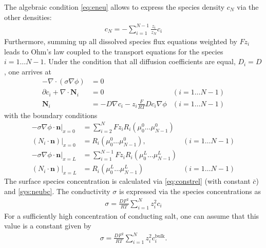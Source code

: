\documentclass[12pt,oneside,reqno]{amsart}
\numberwithin{equation}{section}
\begin{document}
The algebraic condition \ref{eq:eneu} allows to express the species density $c_{N}$ 
via the other densities:
\begin{align}
  c_N=-\sum_{i=1}^{N-1} \frac{z_i}{z_N} c_i
\end{align}
Furthermore, summing up all dissolved species flux equations weighted by $Fz_i$ leads to Ohm's law
coupled to the transport equations for the species $i=1\dots N-1$. Under the condition that all
diffusion coefficients are equal, $D_i=D$, one arrives at
\begin{subequations}\label{sys:ONP}
\begin{align}
  -\nabla\cdot (\sigma\nabla\phi) &= 0\\
  \partial c_i  + \nabla \cdot \mathbf N_i  &=0 & (i=1\dots N-1)\\
  \mathbf N_i &= -D \nabla c_i  - z_i \frac{F}{RT}  D c_i \nabla \phi \label{eq:xddflux} & (i=1\dots N-1)
\end{align}
\end{subequations}
with the boundary conditions
\begin{subequations}\label{ONPbc}
\begin{align}
  -\sigma\nabla\phi \cdot \mathbf n|_{x=0} &= \sum_{i=2}^N Fz_iR_i(\mu_0^0\dots\mu_{N-1}^0)\\
  (N_i\cdot \mathbf n)|_{x=0}&=R_i(\mu_0^0\dots\mu_{N-1}^0), & (i=1\dots N-1)\\
  -\sigma\nabla\phi \cdot \mathbf n|_{x=L} &= \sum_{i=1}^{N-1} Fz_iR_i(\mu_0^L\dots\mu_{N-1}^L)\\
  (N_i\cdot \mathbf n)|_{x=L} &=R_i(\mu_0^L\dots\mu_{N-1}^L) & (i=1\dots N-1)
\end{align}
\end{subequations}
The surface species concentration is calculated via \eqref{eq:constrel} (with constant $\bar c$) and
  \eqref{sys:neubc}.
The  conductivity $\sigma$ is expressed via the species concentrations as
\begin{align}
  \sigma= \frac{DF^2}{RT}\sum_{i=1}^N z_i^2 c_i
\end{align}
For a sufficiently high concentration of conducting salt, one can assume that this value
is a constant given by 
\begin{align}
  \sigma= \frac{DF^2}{RT}\sum_{i=1}^N z_i^2 c_i^{\text{bulk}}.
\end{align}
\end{document}
